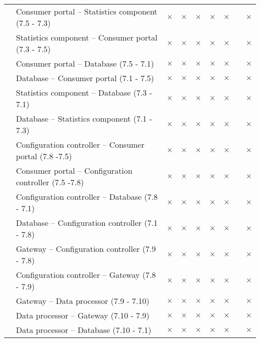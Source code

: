 \begin{table}[h!]
\begin{center}
\begin{longtable}{p{2.3cm} p{9cm} p{0.2cm} p{0.2cm} p{0.2cm} p{0.2cm}p{0.2cm} p{0.2cm} p{0.2cm} }
		   &  Consumer portal -- Statistics component (7.5 - 7.3) & $\times$ & $\times$ & $\times$& $\times$ &  $\times$ & & $\times$\\
		   &  Statistics component -- Consumer portal (7.3 - 7.5) & $\times$ & $\times$ & $\times$& $\times$ &  $\times$ & & $\times$\\
		   &  Consumer portal -- Database (7.5 - 7.1) & $\times$ & $\times$ & $\times$& $\times$ &  $\times$ & & $\times$\\
		   &  Database -- Consumer portal (7.1 - 7.5) & $\times$ & $\times$ & $\times$& $\times$ &  $\times$ & & $\times$\\
		   &  Statistics component -- Database (7.3 - 7.1) & $\times$ & $\times$ & $\times$& $\times$ &  $\times$ & & $\times$\\
		   &  Database -- Statistics component (7.1 - 7.3) & $\times$ & $\times$ & $\times$& $\times$ &  $\times$ & & $\times$\\
		   &  Configuration controller -- Consumer portal (7.8 -7.5) & $\times$ & $\times$ & $\times$& $\times$ &  $\times$ & & $\times$\\
		   &  Consumer portal -- Configuration controller (7.5 -7.8) & $\times$ & $\times$ & $\times$& $\times$ &  $\times$ & & $\times$\\
		   &  Configuration controller -- Database (7.8 - 7.1) & $\times$ & $\times$ & $\times$& $\times$ &  $\times$ & & $\times$\\
		   &  Database -- Configuration controller (7.1 - 7.8) & $\times$ & $\times$ & $\times$& $\times$ &  $\times$ & & $\times$\\
		   &  Gateway -- Configuration controller (7.9 - 7.8) & $\times$ & $\times$ & $\times$& $\times$ &  $\times$ & & $\times$\\
		   &  Configuration controller -- Gateway (7.8 - 7.9) & $\times$ & $\times$ & $\times$& $\times$ &  $\times$ & & $\times$\\
		   &  Gateway -- Data processor (7.9 - 7.10) & $\times$ & $\times$ & $\times$& $\times$ &  $\times$ & & $\times$\\
		   &  Data processor -- Gateway (7.10 - 7.9) & $\times$ & $\times$ & $\times$& $\times$ &  $\times$ & & $\times$\\
		   &  Data processor -- Database (7.10 - 7.1) & $\times$ & $\times$ & $\times$& $\times$ &  $\times$ & & $\times$\\

\end{longtable}
\end{center}
\end{table}
